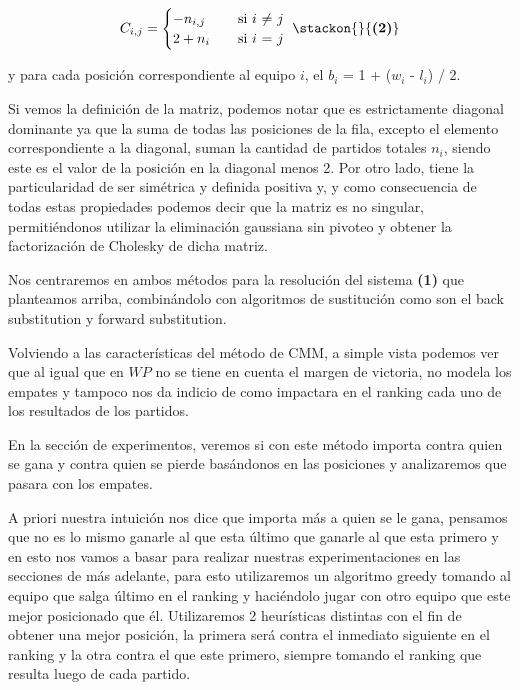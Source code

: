 \[ C_{i,j} =
    \begin{cases}
        -n_{i,j}       & \quad \text{si }  \text{$i$ $\neq$ $j$} \\
        2+n_i & \quad \text{si } \text{$i$ $=$ $j$ }\\
    \end{cases}\hfill \stackon{}{\textbf{(2)}}
$$
  $$  \]
                    
y para cada posición correspondiente al equipo $i$, el $b_i$ = 1 +  ($w_i$ - $l_i$) / 2.

Si vemos la definición de la matriz, podemos notar que es estrictamente diagonal dominante ya que la suma de todas las posiciones de la fila, excepto el elemento correspondiente a la diagonal, suman la cantidad de partidos totales $n_i$, siendo este es el valor de la posición en la diagonal menos 2. 
Por otro lado, tiene la particularidad de ser simétrica y definida positiva y, y como consecuencia de todas estas propiedades podemos decir que la matriz es no singular, permitiéndonos utilizar la eliminación gaussiana sin pivoteo y obtener la factorización de Cholesky de dicha matriz.

Nos centraremos en ambos métodos para la resolución del sistema \textbf{}\textbf{(1)} que planteamos arriba, combinándolo con algoritmos de sustitución como son el back substitution y forward substitution.

Volviendo a las características del método de CMM, a simple vista podemos ver que al igual que en $WP$ no se tiene en cuenta el margen de victoria, no modela los empates y tampoco nos da indicio de como impactara en el ranking cada uno de los resultados de los partidos.

En la sección de experimentos, veremos si con este método importa contra quien se gana y contra quien se pierde basándonos en las posiciones y analizaremos que pasara con los empates. 

A priori nuestra intuición nos dice que importa más a quien se le gana, pensamos que no es lo mismo ganarle al que esta último que ganarle al que esta primero y en esto nos vamos a basar para realizar nuestras experimentaciones en las secciones de más adelante, para esto utilizaremos un algoritmo greedy tomando al equipo que salga último en el ranking y haciéndolo jugar con otro equipo que este mejor posicionado que él. Utilizaremos 2 heurísticas distintas con el fin de obtener una mejor posición, la primera será contra el inmediato siguiente en el ranking y la otra contra el que este primero, siempre tomando el ranking que resulta luego de cada partido.

